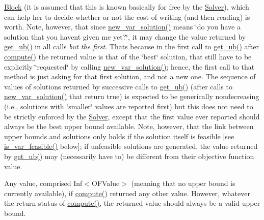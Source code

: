 \begin{DoxyItemize}
\mbox{\hyperlink{class_s_m_spp__di__unipi__it_1_1_block}{Block}} (it is assumed that this is known basically for free by the \mbox{\hyperlink{class_s_m_spp__di__unipi__it_1_1_solver}{Solver}}), which can help her to decide whether or not the cost of writing (and then reading) is worth. Note, however, that since \mbox{\hyperlink{class_s_m_spp__di__unipi__it_1_1_m_c_f_solver_a62678dc9f7485d5a2992c588c5dc7d49}{new\+\_\+var\+\_\+solution()}} means \char`\"{}do you have a solution that you
     haven\textquotesingle{}t given me yet?\char`\"{}, it may change the value returned by \mbox{\hyperlink{class_s_m_spp__di__unipi__it_1_1_m_c_f_solver_a106686dbd21fcdd86e42130d39a7ec2f}{get\+\_\+ub()}} in all calls {\itshape but the first}. That\textquotesingle{}s because in the first call to \mbox{\hyperlink{class_s_m_spp__di__unipi__it_1_1_m_c_f_solver_a106686dbd21fcdd86e42130d39a7ec2f}{get\+\_\+ub()}} after \mbox{\hyperlink{class_s_m_spp__di__unipi__it_1_1_m_c_f_solver_afc8ff54ab05d22f4cca0fb0bfbeb7a49}{compute()}} the returned value is that of the \char`\"{}best\char`\"{} solution, that still have to be explicitly \char`\"{}requested\char`\"{} by calling \mbox{\hyperlink{class_s_m_spp__di__unipi__it_1_1_m_c_f_solver_a62678dc9f7485d5a2992c588c5dc7d49}{new\+\_\+var\+\_\+solution()}}; hence, the first call to that method is just asking for that first solution, and not a new one. The sequence of values of solutions returned by successive calls to \mbox{\hyperlink{class_s_m_spp__di__unipi__it_1_1_m_c_f_solver_a106686dbd21fcdd86e42130d39a7ec2f}{get\+\_\+ub()}} (after calls to \mbox{\hyperlink{class_s_m_spp__di__unipi__it_1_1_m_c_f_solver_a62678dc9f7485d5a2992c588c5dc7d49}{new\+\_\+var\+\_\+solution()}} that return true) is expected to be generically nondecreasing (i.\+e., solutions with \char`\"{}smaller\char`\"{} values are reported first) but this does not need to be strictly enforced by the \mbox{\hyperlink{class_s_m_spp__di__unipi__it_1_1_solver}{Solver}}, except that the first value ever reported should always be the best upper bound available. Note, however, that the link between upper bounds and solutions only holds if the solution itself is feasible \mbox{[}see \mbox{\hyperlink{class_s_m_spp__di__unipi__it_1_1_solver_a038fa1e554e91724e1ce3f593aba55fd}{is\+\_\+var\+\_\+feasible()}} below\mbox{]}; if unfeasible solutions are generated, the value returned by \mbox{\hyperlink{class_s_m_spp__di__unipi__it_1_1_m_c_f_solver_a106686dbd21fcdd86e42130d39a7ec2f}{get\+\_\+ub()}} may (necessarily have to) be different from their objective function value.
\item Any value, comprised Inf$<$\+O\+F\+Value$>$ (meaning that no upper bound is currently available), if \mbox{\hyperlink{class_s_m_spp__di__unipi__it_1_1_m_c_f_solver_afc8ff54ab05d22f4cca0fb0bfbeb7a49}{compute()}} returned any other value. However, whatever the return status of \mbox{\hyperlink{class_s_m_spp__di__unipi__it_1_1_m_c_f_solver_afc8ff54ab05d22f4cca0fb0bfbeb7a49}{compute()}}, the returned value should always be a valid upper bound.
\end{DoxyItemize}

